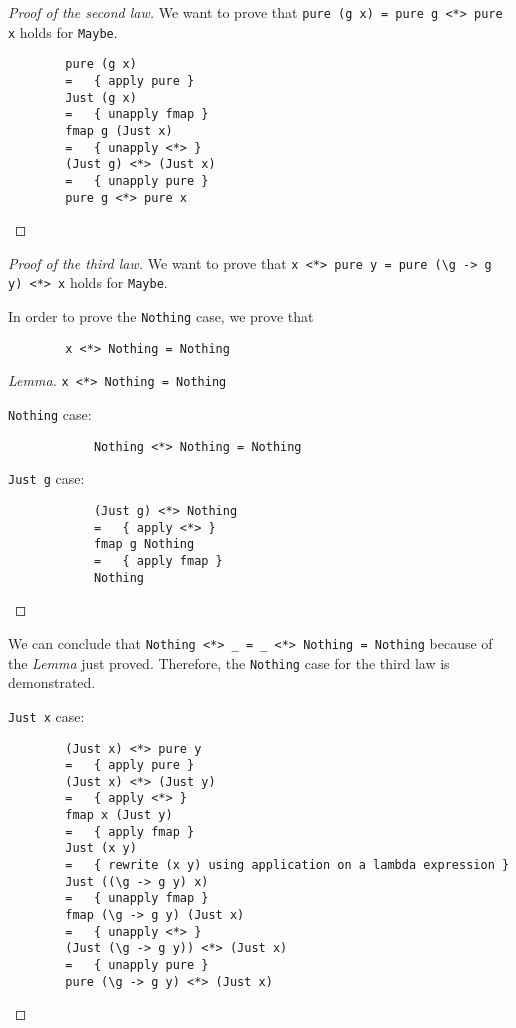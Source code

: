 \documentclass[a4paper]{scrartcl}
\begin{document}
\begin{proof}[Proof of the second law]
	We want to prove that \verb|pure (g x) = pure g <*> pure x| holds for \verb|Maybe|.
	
	\begin{verbatim}
		pure (g x)
		=   { apply pure }
		Just (g x)
		=   { unapply fmap }
		fmap g (Just x)
		=   { unapply <*> }
		(Just g) <*> (Just x)
		=   { unapply pure }
		pure g <*> pure x
	\end{verbatim}
\end{proof}

\begin{proof}[Proof of the third law]
	We want to prove that \verb|x <*> pure y = pure (\g -> g y) <*> x| holds for \verb|Maybe|.
	
	In order to prove the \verb|Nothing| case, we prove that
	
	\begin{verbatim}
		x <*> Nothing = Nothing
	\end{verbatim}
	
	\begin{proof}[Lemma] \verb|x <*> Nothing = Nothing|
		
		\verb|Nothing| case:
		
		\begin{verbatim}
			Nothing <*> Nothing = Nothing
		\end{verbatim}
		
		\verb|Just g| case:
		
		\begin{verbatim}
			(Just g) <*> Nothing
			=   { apply <*> }
			fmap g Nothing
			=   { apply fmap }
			Nothing
		\end{verbatim}
	\end{proof}
	
	We can conclude that \verb|Nothing <*> _ = _ <*> Nothing = Nothing| because of the \emph{Lemma} just proved. Therefore, the \verb|Nothing| case for the third law is demonstrated.
	
	
	\verb|Just x| case:
	
	\begin{verbatim}
		(Just x) <*> pure y
		=   { apply pure }
		(Just x) <*> (Just y)
		=   { apply <*> }
		fmap x (Just y)
		=   { apply fmap }
		Just (x y)
		=   { rewrite (x y) using application on a lambda expression }
		Just ((\g -> g y) x)
		=   { unapply fmap }
		fmap (\g -> g y) (Just x)
		=   { unapply <*> }
		(Just (\g -> g y)) <*> (Just x)
		=   { unapply pure }
		pure (\g -> g y) <*> (Just x)
	\end{verbatim}
\end{proof}
\end{document}
